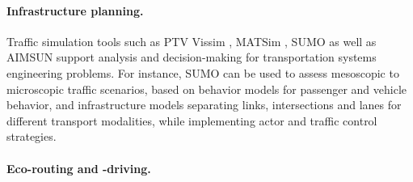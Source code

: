 \documentclass[a4paper,twoside]{article}
\begin{document}
%	
%
%	

	\paragraph{Infrastructure planning.}
\label{sec:infrastructure-planning}
	
	
	Traffic simulation tools such as PTV Vissim \cite{fellendorf_vissim_1994}, MATSim \cite{w_axhausen_multi-agent_2016}, SUMO \cite{lopez_microscopic_2018} as well as AIMSUN \cite{barcelo2005dynamic} support analysis and decision-making for transportation systems engineering problems. %
	For instance, SUMO can be used to assess mesoscopic to microscopic traffic scenarios, based on behavior models for passenger and vehicle behavior, and infrastructure models separating links, intersections and lanes for different transport modalities, while implementing actor and traffic control strategies.
	

	\paragraph{Eco-routing and -driving.}
\label{sec:eco-routing}
\end{document}
